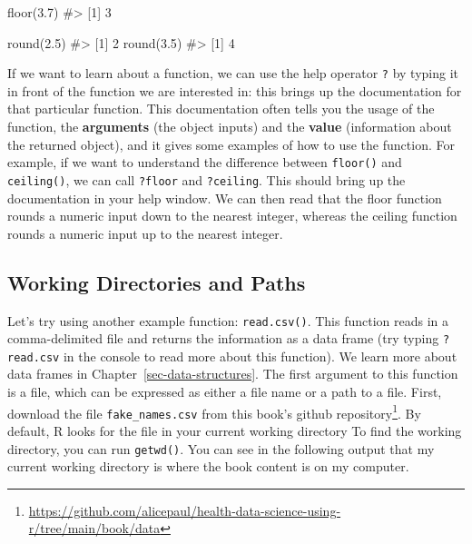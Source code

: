 \documentclass[
  letterpaper,
]{latex/krantz}
\makeatletter
\newenvironment{Shaded}{\begin{snugshade}}{\end{snugshade}}
\newcommand{\CommentTok}[1]{\textcolor[rgb]{0.37,0.37,0.37}{#1}}
\newcommand{\FloatTok}[1]{\textcolor[rgb]{0.68,0.00,0.00}{#1}}
\newcommand{\FunctionTok}[1]{\textcolor[rgb]{0.28,0.35,0.67}{#1}}
\newcommand{\NormalTok}[1]{\textcolor[rgb]{0.00,0.23,0.31}{#1}}
\renewcommand{\href}[2]{#2\footnote{\url{#1}}}
\newenvironment{kframe}{%
\medskip{}
\setlength{\fboxsep}{.8em}
 \def\at@end@of@kframe{}%
 \ifinner\ifhmode%
  \def\at@end@of@kframe{\end{minipage}}%
  \begin{minipage}{\columnwidth}%
 \fi\fi%
 \def\FrameCommand##1{\hskip\@totalleftmargin \hskip-\fboxsep
 \colorbox{shadecolor}{##1}\hskip-\fboxsep
     \hskip-\linewidth \hskip-\@totalleftmargin \hskip\columnwidth}%
 \MakeFramed {\advance\hsize-\width
   \@totalleftmargin\z@ \linewidth\hsize
   \@setminipage}}%
 {\par\unskip\endMakeFramed%
 \at@end@of@kframe}
\renewenvironment{Shaded}{\begin{kframe}}{\end{kframe}}
\makeatother
\begin{document}
\begin{Shaded}
\begin{Highlighting}[]
\FunctionTok{floor}\NormalTok{(}\FloatTok{3.7}\NormalTok{)}
\CommentTok{\#\textgreater{} [1] 3}
\end{Highlighting}
\end{Shaded}

\begin{Shaded}
\begin{Highlighting}[]
\FunctionTok{round}\NormalTok{(}\FloatTok{2.5}\NormalTok{)}
\CommentTok{\#\textgreater{} [1] 2}
\FunctionTok{round}\NormalTok{(}\FloatTok{3.5}\NormalTok{)}
\CommentTok{\#\textgreater{} [1] 4}
\end{Highlighting}
\end{Shaded}

If we want to learn about a function, we can use the help operator
\texttt{?}  by typing it in front of the function
we are interested in: this brings up the documentation
 for that particular function. This
documentation often tells you the usage of the function, the
\textbf{arguments}  (the object inputs) and
the \textbf{value}  (information about the
returned object), and it gives some examples of how to use the function.
For example, if we want to understand the difference between
\texttt{floor()} and \texttt{ceiling()}, we can call \texttt{?floor} and
\texttt{?ceiling}. This should bring up the documentation in your help
window. We can then read that the floor function rounds a numeric input
down to the nearest integer, whereas the ceiling function rounds a
numeric input up to the nearest integer.

\subsection{Working Directories and
Paths}\label{working-directories-and-paths}

Let's try using another example function:
\texttt{read.csv()}.
This function reads in a comma-delimited file and returns the
information as a data frame (try typing \texttt{?read.csv} in the
console to read more about this function). We learn more about data
frames in Chapter~\ref{sec-data-structures}. The first argument to this
function is a file, which can be expressed as either a file name or a
path to a file. First, download the file \texttt{fake\_names.csv} from
this book's
\href{https://github.com/alicepaul/health-data-science-using-r/tree/main/book/data}{github
repository}. By default, R looks for the file in your current working
directory To find the working directory, you
can run \texttt{getwd()}.
You can see in the following output that my current working directory is
where the book content is on my computer.
\end{document}

